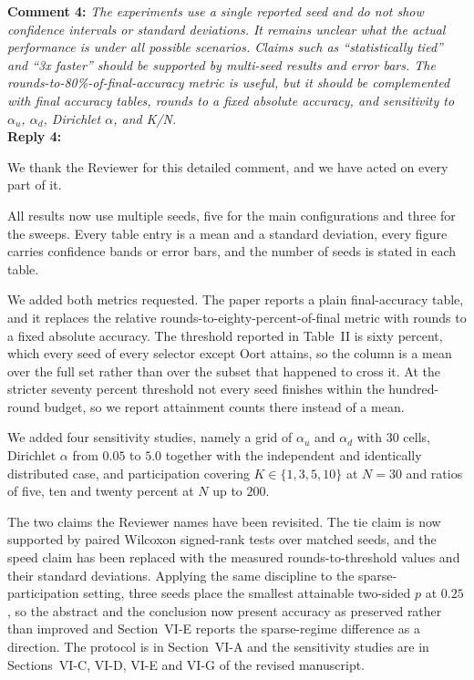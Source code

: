 \documentclass[10pt]{article}
\begin{document}
\noindent
\textbf{Comment 4:} \textit{The experiments use a single reported seed and do not show confidence intervals or standard deviations. It remains unclear what the actual performance is under all possible scenarios. Claims such as ``statistically tied'' and ``3x faster'' should be supported by multi-seed results and error bars. The rounds-to-80\%-of-final-accuracy metric is useful, but it should be complemented with final accuracy tables, rounds to a fixed absolute accuracy, and sensitivity to $\alpha_u$, $\alpha_d$, Dirichlet $\alpha$, and K/N.} \\
\noindent
\textbf{Reply 4:} {We thank the Reviewer for this detailed comment, and we have acted on every part of it.

All results now use multiple seeds, five for the main configurations and three for the sweeps. Every table entry is a mean and a standard deviation, every figure carries confidence bands or error bars, and the number of seeds is stated in each table.

We added both metrics requested. The paper reports a plain final-accuracy table, and it replaces the relative rounds-to-eighty-percent-of-final metric with rounds to a fixed absolute accuracy. The threshold reported in Table~II is sixty percent, which every seed of every selector except Oort attains, so the column is a mean over the full set rather than over the subset that happened to cross it. At the stricter seventy percent threshold not every seed finishes within the hundred-round budget, so we report attainment counts there instead of a mean.

We added four sensitivity studies, namely a grid of $\alpha_u$ and $\alpha_d$ with $30$ cells, Dirichlet $\alpha$ from $0.05$ to $5.0$ together with the independent and identically distributed case, and participation covering $K \in \{1, 3, 5, 10\}$ at $N = 30$ and ratios of five, ten and twenty percent at $N$ up to $200$.

The two claims the Reviewer names have been revisited. The tie claim is now supported by paired Wilcoxon signed-rank tests over matched seeds, and the speed claim has been replaced with the measured rounds-to-threshold values and their standard deviations. Applying the same discipline to the sparse-participation setting, three seeds place the smallest attainable two-sided $p$ at $0.25$, so the abstract and the conclusion now present accuracy as preserved rather than improved and Section~VI-E reports the sparse-regime difference as a direction. The protocol is in Section~VI-A and the sensitivity studies are in Sections~VI-C, VI-D, VI-E and VI-G of the revised manuscript.}\\
\end{document}

